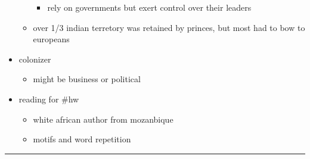 \documentclass[letterpaper]{article}
\begin{document}
\begin{itemize}
\begin{itemize}
\begin{itemize}
\item rely on governments but exert control over their leaders
\end{itemize}

\item over 1/3 indian terretory was retained by princes, but most had to
bow to europeans
\end{itemize}

\item colonizer

\begin{itemize}
\item might be business or political
\end{itemize}

\item reading for \#hw

\begin{itemize}
\item white african author from mozanbique
\item motifs and word repetition
\end{itemize}
\end{itemize}

\noindent\rule{\textwidth}{0.5pt}
\end{document}
